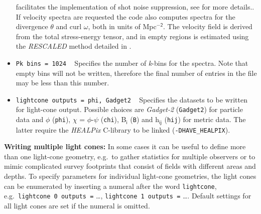 \documentclass[a4paper,10pt]{article}
\begin{document}
\begin{itemize}
{facilitates the implementation of shot noise suppression, see \cite{Adamek:2016zes} for more details.}. If velocity spectra are requested
the code also computes spectra for the divergence $\mathsf{\theta}$ and curl $\mathsf{\omega}$, both in units of Mpc$^\mathsf{-2}$. The
velocity field is derived from the total stress-energy tensor, and in empty regions is estimated using the \textit{RESCALED} method detailed in \cite{Jelic-Cizmek:2018gdp}.
 \item[] \hspace{-25pt}\texttt{Pk bins = 1024} ~ Specifies the number of \textit{k}-bins for the spectra. Note that empty bins will not be
 written, therefore the final number of entries in the file may be less than this number.
 \item[] \hspace{-25pt}\texttt{lightcone outputs = phi, Gadget2} ~ Specifies the datasets to be written for light-cone output. Possible
 choices are \textit{Gadget-2} (\texttt{Gadget2}) for particle data and $\mathsf{\phi}$ (\texttt{phi}),
 $\mathsf{\chi}$ = $\mathsf{\phi}$-$\mathsf{\psi}$ (\texttt{chi}), B$_\mathsf{i}$ (\texttt{B}) and h$_\mathsf{ij}$ (\texttt{hij}) for metric data.
 The latter require the \textit{HEALPix} C-library to be linked (\texttt{-DHAVE\_HEALPIX}).
 \end{itemize}
\noindent\textbf{Writing multiple light cones:} In some cases it can be useful to define more than one light-cone geometry, e.g.\ to gather statistics for
multiple observers or to mimic complicated survey footprints that consist of fields with different areas and depths. To specify parameters for individual
light-cone geometries, the light cones can be enumerated by inserting a numeral after the word \texttt{lightcone}, e.g.\ \texttt{lightcone 0 outputs =} \ldots,
\texttt{lightcone 1 outputs =} \ldots. Default settings for all light cones are set if the numeral is omitted.
\end{document}
